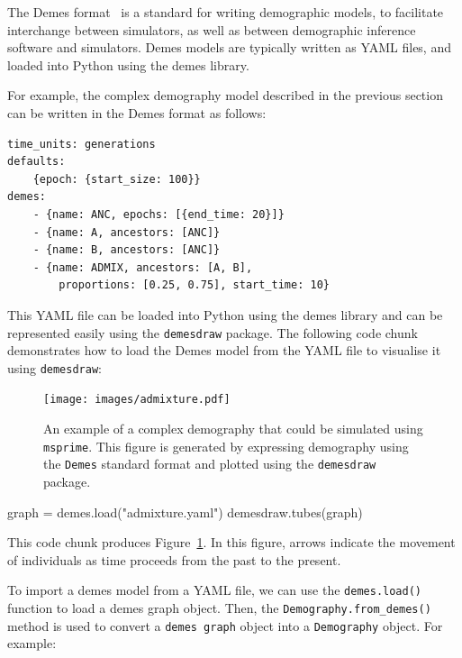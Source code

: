 \documentclass[graybox]{svmult}
\newcommand{\msprime}[0]{\texttt{msprime}}
\begin{document}
The Demes format~\citep{gower2022demes} is a standard for writing
demographic models, to facilitate interchange between simulators, as well as between
demographic inference software and simulators. Demes models are typically written as
YAML files, and loaded into Python using the demes library.

For example, the complex demography model described in the previous section can be
written in the Demes format as follows:

\begin{footnotesize}
\begin{verbatim}
time_units: generations
defaults:
    {epoch: {start_size: 100}}
demes:
    - {name: ANC, epochs: [{end_time: 20}]}
    - {name: A, ancestors: [ANC]}
    - {name: B, ancestors: [ANC]}
    - {name: ADMIX, ancestors: [A, B],
        proportions: [0.25, 0.75], start_time: 10}
\end{verbatim}
\end{footnotesize}

This YAML file can be loaded into Python using the demes library and can be represented
easily using the \texttt{demesdraw} package. The following code chunk demonstrates how to
load the Demes model from the YAML file to visualise it using \texttt{demesdraw}:

\begin{figure}[t]
\centering
\texttt{[image: images/admixture.pdf]}
\caption{\label{fig:complex-demography}An example of a complex demography that could be
simulated using \msprime. This figure is generated by expressing demography using the
\texttt{Demes} standard format and plotted using the \texttt{demesdraw} package.}
\end{figure}

\begin{pythoncode}
graph = demes.load("admixture.yaml")
demesdraw.tubes(graph)
\end{pythoncode}
This code chunk produces Figure~\ref{fig:complex-demography}. In this figure, arrows indicate
the movement of individuals as time proceeds from the past to the present.

To import a demes model from a YAML file, we can use the \texttt{demes.load()} function to
load a demes graph object. Then, the \texttt{Demography.from\_demes()} method is used to convert a
\texttt{demes graph} object into a \texttt{Demography} object.
For example:
\end{document}
